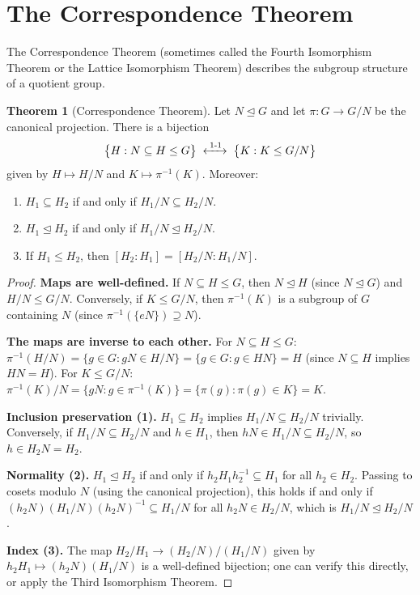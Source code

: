 \documentclass[12pt,a4paper,openany]{book}
\theoremstyle{definition}
\newtheorem{theorem}{Theorem}[chapter]
\theoremstyle{remark}
\begin{document}
\section{The Correspondence Theorem}\label{sec:correspondence}

The Correspondence Theorem (sometimes called the Fourth Isomorphism
Theorem or the Lattice Isomorphism Theorem) describes the subgroup
structure of a quotient group.

\begin{theorem}[Correspondence Theorem]\label{thm:correspondence}
Let $N\trianglelefteq G$ and let $\pi\colon G\to G/N$ be the canonical
projection.  There is a bijection
\[
   \bigl\{H : N\subseteq H\le G\bigr\}
   \;\xleftrightarrow{\;1\text{-}1\;}\;
   \bigl\{K : K\le G/N\bigr\}
\]
given by $H\mapsto H/N$ and $K\mapsto \pi^{-1}(K)$.  Moreover:
\begin{enumerate}
\item $H_1\subseteq H_2$ if and only if $H_1/N\subseteq H_2/N$.
\item $H_1\trianglelefteq H_2$ if and only if
      $H_1/N\trianglelefteq H_2/N$.
\item If $H_1\le H_2$, then $[H_2:H_1]=[H_2/N:H_1/N]$.
\end{enumerate}
\end{theorem}

\begin{proof}
\textbf{Maps are well-defined.}
If $N\subseteq H\le G$, then $N\trianglelefteq H$ (since
$N\trianglelefteq G$) and $H/N\le G/N$.  Conversely, if $K\le G/N$,
then $\pi^{-1}(K)$ is a subgroup of $G$ containing $N$ (since
$\pi^{-1}(\{eN\})\supseteq N$).

\textbf{The maps are inverse to each other.}
For $N\subseteq H\le G$: $\pi^{-1}(H/N)=\{g\in G : gN\in H/N\}
=\{g\in G : g\in HN\}=H$ (since $N\subseteq H$ implies $HN=H$).
For $K\le G/N$: $\pi^{-1}(K)/N=\{gN : g\in\pi^{-1}(K)\}
=\{\pi(g) : \pi(g)\in K\}=K$.

\textbf{Inclusion preservation (1).}
$H_1\subseteq H_2$ implies $H_1/N\subseteq H_2/N$ trivially.
Conversely, if $H_1/N\subseteq H_2/N$ and $h\in H_1$, then
$hN\in H_1/N\subseteq H_2/N$, so $h\in H_2 N=H_2$.

\textbf{Normality (2).}
$H_1\trianglelefteq H_2$ if and only if $h_2 H_1 h_2^{-1}\subseteq H_1$
for all $h_2\in H_2$.  Passing to cosets modulo $N$ (using the
canonical projection), this holds if and only if
$(h_2 N)(H_1/N)(h_2 N)^{-1}\subseteq H_1/N$ for all $h_2 N\in H_2/N$,
which is $H_1/N\trianglelefteq H_2/N$.

\textbf{Index (3).}
The map $H_2/H_1\to (H_2/N)/(H_1/N)$ given by $h_2 H_1\mapsto
(h_2 N)(H_1/N)$ is a well-defined bijection; one can verify this
directly, or apply the Third Isomorphism Theorem.
\end{proof}
\end{document}
